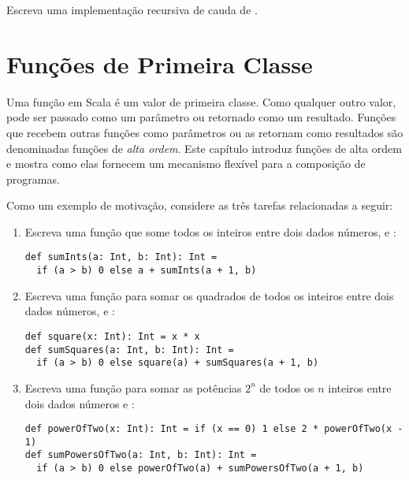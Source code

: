 \begin{exercise} Escreva uma implementa\c{c}\~{a}o recursiva de cauda de 
.
\end{exercise}

\chapter{\label{chap:first-class-funs}Fun\c{c}\~{o}es de Primeira Classe}
Uma fun\c{c}\~{a}o em Scala \'{e} um valor de primeira classe. Como qualquer outro valor, 
pode ser passado como um par\^{a}metro ou retornado como um resultado. Fun\c{c}\~{o}es que 
recebem outras fun\c{c}\~{o}es como par\^{a}metros ou as retornam como resultados s\~{a}o 
denominadas fun\c{c}\~{o}es de {\em alta ordem}. Este cap\'{i}tulo introduz fun\c{c}\~{o}es de alta ordem 
e mostra como elas fornecem um mecanismo flex\'{i}vel para a composi\c{c}\~{a}o de programas.

Como um exemplo de motiva\c{c}\~{a}o, considere as tr\^{e}s tarefas relacionadas a seguir:
\begin{enumerate}
\item

Escreva uma fun\c{c}\~{a}o que some todos os inteiros entre dois dados n\'{u}meros,  e :  
\begin{lstlisting}
def sumInts(a: Int, b: Int): Int =
  if (a > b) 0 else a + sumInts(a + 1, b)
\end{lstlisting}

\item 

Escreva uma fun\c{c}\~{a}o para somar os quadrados de todos os inteiros entre dois dados n\'{u}meros, 
  e :

\begin{lstlisting}
def square(x: Int): Int = x * x
def sumSquares(a: Int, b: Int): Int =
  if (a > b) 0 else square(a) + sumSquares(a + 1, b)
\end{lstlisting}
\item
Escreva uma fun\c{c}\~{a}o para somar as pot\^{e}ncias $2^n$ de todos os $n$ inteiros entre
dois dados n\'{u}meros  e :  

\begin{lstlisting}
def powerOfTwo(x: Int): Int = if (x == 0) 1 else 2 * powerOfTwo(x - 1)
def sumPowersOfTwo(a: Int, b: Int): Int =
  if (a > b) 0 else powerOfTwo(a) + sumPowersOfTwo(a + 1, b)
\end{lstlisting}
\end{enumerate}

